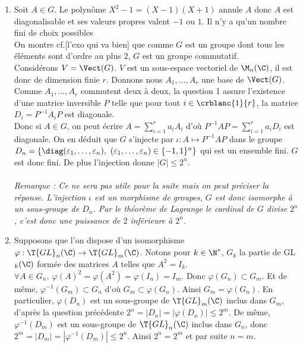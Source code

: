 \documentclass[8pt]{book}
\begin{document}
\begin{enumerate}[leftmargin=*]
\begin{enumerate}[label=\alph*.]
	\end{enumerate}
	\item Soit $A\in G$. Le polynôme $X^2-1=(X-1)(X+1)$ annule $A$ donc $A$ est diagonalisable et ses valeurs propres valent $-1$ ou $1$. Il n'y a qu'un nombre fini de choix possibles\\
	On montre cf.[l'exo qui va bien] que comme $G$ est un groupe dont tous les éléments sont d'ordre au plus $2$, $G$ est un groupe commutatif.\\
	Considérons $V=\Vect(G)$. $V$ est un sous-espace vectoriel de $\M_n(\C)$, il est donc de dimension finie $r$. Donnons nous $A_1,\dots,A_r$ une base de $\Vect(G)$. Comme $A_1,\dots,A_r$ commutent deux à deux, la question 1 assure l'existence d'une matrice inversible $P$ telle que pour tout $i\in \crblanc{1}{r}$, la matrice $D_i=P^{-1}A_iP$ est diagonale.\\
	Donc si $A\in G$, on peut écrire $A=\displaystyle\sum_{i=1}^ra_iA_i$ d'où $P^{-1}AP=\displaystyle\sum_{i=1}^ra_iD_i$ est diagonale. On en déduit que $G$ s'injecte par $\iota:A\mapsto P^{-1}AP$ dans le groupe $D_n=\{\diag(\varepsilon_1,\dots,\varepsilon_n),\ (\varepsilon_1,\dots,\varepsilon_n)\in \{-1,1\}^n\}$ qui est un ensemble fini. $G$ est donc fini. De plus l'injection donne $|G|\leq 2^n$.\\\\
	\textit{Remarque : Ce ne sera pas utile pour la suite mais on peut préciser la réponse. L'injection $\iota$ est un morphisme de groupes, $G$ est donc isomorphe à un sous-groupe de $D_n$. Par le théorème de Lagrange le cardinal de $G$ divise $2^n$, c'est donc une puissance de $2$ inférieure à $2^n$.}
	\item Supposons que l'on dispose d'un isomorphisme $\varphi:\T{GL}_n(\C)\to\T{GL}_m(\C)$. Notons pour $k\in \N^*$, $G_k$ la partie de GL$_k(\C)$ formée des matrices $A$ telles que $A^2=I_k$.\\
	$\forall A\in G_n,\ \varphi(A)^2=\varphi(A^2)=\varphi(I_n)=I_m$. Donc $\varphi(G_n)\subset G_m$. Et de même, $\varphi^{-1}(G_m)\subset G_n$ d'où $G_m\subset \varphi(G_n)$. Ainsi $G_m=\varphi(G_n)$. En particulier, $\varphi(D_n)$ est un sous-groupe de $\T{GL}_m(\C)$ inclus dans $G_m$, d'après la question précédente $2^n=|D_n|=|\varphi(D_n)|\leq 2^m$. De même, $\varphi^{-1}(D_m)$ est un sous-groupe de $\T{GL}_n(\C)$ inclus dans $G_n$, donc $2^m=|D_m|=|\varphi^{-1}(D_m)|\leq 2^n$. Ainsi $2^n=2^m$ et par suite $n=m$.
	\end{enumerate}
	
\end{document}
